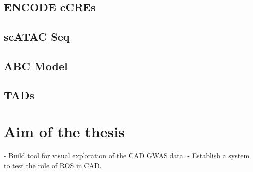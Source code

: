     \subsection{ENCODE cCREs}
    \cite{SCREENSearchCandidate, mooreExpandedEncyclopaediasDNA2020}

    \subsection{scATAC Seq}
    \cite{buenrostroTranspositionNativeChromatin2013} %
    \cite{turnerCellspecificChromatinLandscape2021a} %
    \cite{zhangSinglecellAtlasChromatin2021} %

    \subsection{ABC Model}
    \cite{fulcoActivitybycontactModelEnhancer2019a, nasserGenomewideEnhancerMaps2021a}

    \subsection{TADs}
    \cite{wang3DGenomeBrowser2018}

\section{Aim of the thesis}
\label{sec:Aim}
- Build tool for visual exploration of the CAD GWAS data.
- Establish a system to test the role of ROS in CAD.

